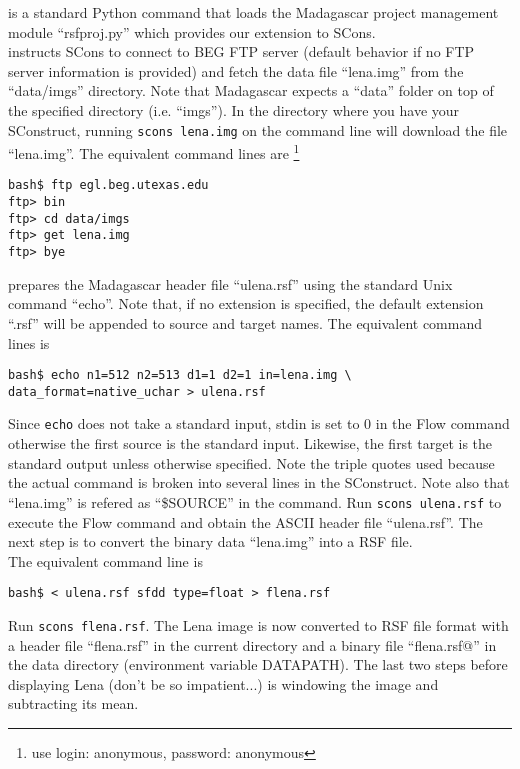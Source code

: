 
%
is a standard Python command that loads the Madagascar project
management module ``rsfproj.py'' which provides our extension to
SCons.\\


%
instructs SCons to connect to BEG FTP server (default behavior if no
FTP server information is provided) and fetch the data file
``lena.img'' from the ``data/imgs'' directory. Note that Madagascar
expects a ``data'' folder on top of the specified directory (i.e.
``imgs''). In the directory where you have your SConstruct, running
\texttt{scons lena.img} on the command line will download the file
``lena.img''.  The equivalent command lines are \footnote{use login:
  anonymous, password: anonymous}
\begin{verbatim}
bash$ ftp egl.beg.utexas.edu
ftp> bin
ftp> cd data/imgs
ftp> get lena.img
ftp> bye
\end{verbatim}
%

%
prepares the Madagascar header file ``ulena.rsf'' using the standard
Unix command ``echo''. Note that, if no extension is specified, the
default extension ``.rsf'' will be appended to source and target
names. The equivalent command lines is
%
\begin{verbatim}
bash$ echo n1=512 n2=513 d1=1 d2=1 in=lena.img \
data_format=native_uchar > ulena.rsf
\end{verbatim}
%
Since \texttt{echo} does not take a standard input, stdin is set to 0
in the Flow command otherwise the first source is the standard input.
Likewise, the first target is the standard output unless otherwise
specified. Note the triple quotes used because the actual command is
broken into several lines in the SConstruct. Note also that
``lena.img'' is refered as ``\$SOURCE'' in the command. Run
\texttt{scons ulena.rsf} to execute the Flow command and obtain the
ASCII header file ``ulena.rsf''.  The next step is to convert the
binary data ``lena.img'' into a RSF file.\\


%
The equivalent command line is
%
\begin{verbatim}
bash$ < ulena.rsf sfdd type=float > flena.rsf
\end{verbatim}
%
Run \texttt{scons flena.rsf}. The Lena image is now converted to RSF
file format with a header file ``flena.rsf'' in the current directory
and a binary file ``flena.rsf@'' in the data directory (environment
variable DATAPATH). The last two steps before displaying Lena (don't
be so impatient...)  is windowing the image and subtracting its mean.\\

